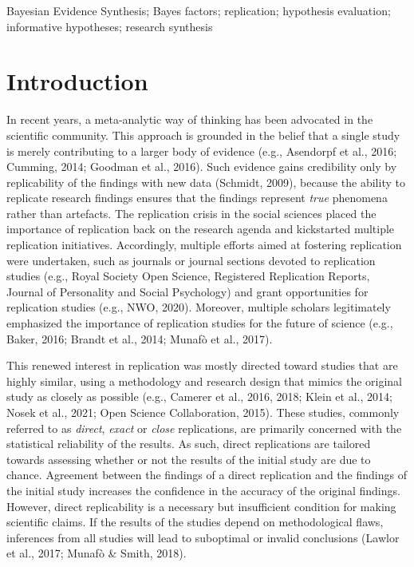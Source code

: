 \documentclass[
]{interact}
\begin{document}
Bayesian Evidence Synthesis; Bayes factors; replication; hypothesis
evaluation; informative hypotheses; research synthesis

\hypertarget{introduction}{%
\section{Introduction}\label{introduction}}

In recent years, a meta-analytic way of thinking has been advocated in
the scientific community. This approach is grounded in the belief that a
single study is merely contributing to a larger body of evidence (e.g.,
Asendorpf et al., 2016; Cumming, 2014; Goodman et al., 2016). Such
evidence gains credibility only by replicability of the findings with
new data (Schmidt, 2009), because the ability to replicate research
findings ensures that the findings represent \emph{true} phenomena
rather than artefacts. The replication crisis in the social sciences
placed the importance of replication back on the research agenda and
kickstarted multiple replication initiatives. Accordingly, multiple
efforts aimed at fostering replication were undertaken, such as journals
or journal sections devoted to replication studies (e.g., Royal Society
Open Science, Registered Replication Reports, Journal of Personality and
Social Psychology) and grant opportunities for replication studies
(e.g., NWO, 2020). Moreover, multiple scholars legitimately emphasized
the importance of replication studies for the future of science (e.g.,
Baker, 2016; Brandt et al., 2014; Munafò et al., 2017).

This renewed interest in replication was mostly directed toward studies
that are highly similar, using a methodology and research design that
mimics the original study as closely as possible (e.g., Camerer et al.,
2016, 2018; Klein et al., 2014; Nosek et al., 2021; Open Science
Collaboration, 2015). These studies, commonly referred to as
\emph{direct}, \emph{exact} or \emph{close} replications, are primarily
concerned with the statistical reliability of the results. As such,
direct replications are tailored towards assessing whether or not the
results of the initial study are due to chance. Agreement between the
findings of a direct replication and the findings of the initial study
increases the confidence in the accuracy of the original findings.
However, direct replicability is a necessary but insufficient condition
for making scientific claims. If the results of the studies depend on
methodological flaws, inferences from all studies will lead to
suboptimal or invalid conclusions (Lawlor et al., 2017; Munafò \& Smith,
2018).
\end{document}
